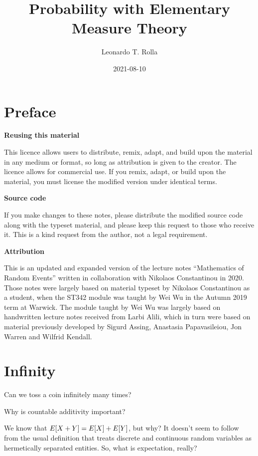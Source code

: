 \documentclass[
]{book}
\title{Probability with Elementary Measure Theory}
\author{Leonardo T. Rolla}
\date{2021-08-10}
\let\mathbb\relax %
\newcommand{\E}{\mathbb{E}}
\theoremstyle{definition}
\theoremstyle{definition}
\theoremstyle{definition}
\theoremstyle{definition}
\theoremstyle{remark}
\begin{document}
\maketitle

{
\setcounter{tocdepth}{1}
\tableofcontents
}
\hypertarget{preface}{%
\chapter*{Preface}\label{preface}}

\textbf{Reusing this material}

This licence allows users to distribute, remix, adapt, and build upon
the material in any medium or format, so long as attribution is given to
the creator. The licence allows for commercial use. If you remix, adapt,
or build upon the material, you must license the modified version under
identical terms.

\textbf{Source code}

If you make changes to these notes, please distribute the modified
source code along with the typeset material, and please keep this
request to those who receive it. This is a kind request from the author,
not a legal requirement.

\textbf{Attribution}

This is an updated and expanded version of the lecture notes
``Mathematics of Random Events'' written in collaboration with Nikolaos
Constantinou in 2020. Those notes were largely based on material typeset
by Nikolaos Constantinou as a student, when the ST342 module was taught
by Wei Wu in the Autumn 2019 term at Warwick. The module taught by Wei
Wu was largely based on handwritten lecture notes received from Larbi
Alili, which in turn were based on material previously developed by
Sigurd Assing, Anastasia Papavasileiou, Jon Warren and Wilfrid Kendall.

\hypertarget{sec:intro}{%
\chapter{Infinity}\label{sec:intro}}

Can we toss a coin infinitely many times?

Why is countable additivity important?

We know that \(\E[X+Y]=\E[X] + \E[Y]\), but why? It doesn't seem to follow
from the usual definition that treats discrete and continuous random
variables as hermetically separated entities. So, what is expectation,
really?
\end{document}
